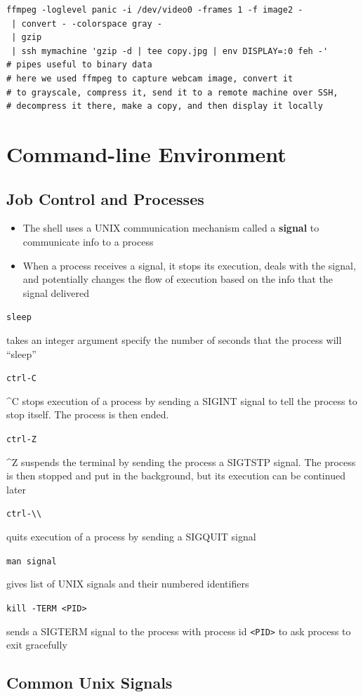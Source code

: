 \documentclass[letterpaper,12pt]{article}
\newcommand*{\lstitem}[1]{
  \setbox0\hbox{\lstinline{#1}}
  \item[\usebox0]
}
\begin{document}
\begin{lstlisting}
ffmpeg -loglevel panic -i /dev/video0 -frames 1 -f image2 -
 | convert - -colorspace gray -
 | gzip
 | ssh mymachine 'gzip -d | tee copy.jpg | env DISPLAY=:0 feh -'
# pipes useful to binary data
# here we used ffmpeg to capture webcam image, convert it
# to grayscale, compress it, send it to a remote machine over SSH,
# decompress it there, make a copy, and then display it locally
\end{lstlisting}

\section{Command-line Environment}

\subsection{Job Control and Processes}
\begin{itemize}
 \item The shell uses a UNIX communication mechanism called a \textbf{signal} to communicate info to a process
 \item When a process receives a signal, it stops its execution, deals with the signal, and potentially changes the flow of execution based on the info that the signal delivered
\end{itemize}

\begin{description}
 \lstitem{sleep} takes an integer argument specify the number of seconds that the process will ``sleep''
 \lstitem{ctrl-C} \^{}C stops execution of a process  by sending a SIGINT signal to tell the process to stop itself. The process is then ended.
 \lstitem{ctrl-Z} \^{}Z suspends the terminal by sending the process a SIGTSTP signal. The process is then stopped and put in the background, but its execution can be continued later
 \lstitem{ctrl-\\} quits execution of a process by sending a SIGQUIT signal
 \lstitem{man signal} gives list of UNIX signals and their numbered identifiers
 \lstitem{kill -TERM <PID>} sends a SIGTERM signal to the process with process id \lstinline{<PID>} to ask process to exit gracefully
\end{description}

\subsection{Common Unix Signals}
\end{document}
